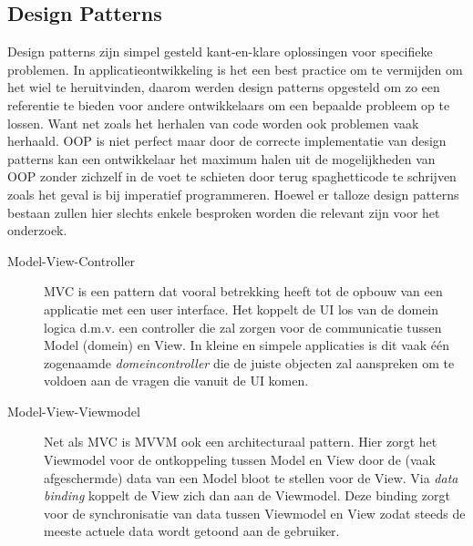 \subsection{Design Patterns}
Design patterns zijn simpel gesteld kant-en-klare oplossingen voor specifieke problemen. In applicatieontwikkeling is het een best practice om te vermijden om het wiel te heruitvinden, daarom werden design patterns opgesteld om zo een referentie te bieden voor andere ontwikkelaars om een bepaalde probleem op te lossen. Want net zoals het herhalen van code worden ook problemen vaak herhaald. OOP is niet perfect maar door de correcte implementatie van design patterns kan een ontwikkelaar het maximum halen uit de mogelijkheden van OOP zonder zichzelf in de voet te schieten door terug spaghetticode te schrijven zoals het geval is bij imperatief programmeren. Hoewel er talloze design patterns bestaan zullen hier slechts enkele besproken worden die relevant zijn voor het onderzoek.

\begin{description}
  \item [Model-View-Controller] MVC is een pattern dat vooral betrekking heeft tot de opbouw van een applicatie met een user interface. Het koppelt de UI los van de domein logica d.m.v. een controller die zal zorgen voor de communicatie tussen Model (domein) en View. In kleine en simpele applicaties is dit vaak één zogenaamde \textit{domeincontroller} die de juiste objecten zal aanspreken om te voldoen aan de vragen die vanuit de UI komen. 
  \item [Model-View-Viewmodel] Net als MVC is MVVM ook een architecturaal pattern. Hier zorgt het Viewmodel voor de ontkoppeling tussen Model en View door de (vaak afgeschermde) data van een Model bloot te stellen voor de View. Via \textit{data binding} koppelt de View zich dan aan de Viewmodel. Deze binding zorgt voor de synchronisatie van data tussen Viewmodel en View zodat steeds de meeste actuele data wordt getoond aan de gebruiker. 
\end{description}

